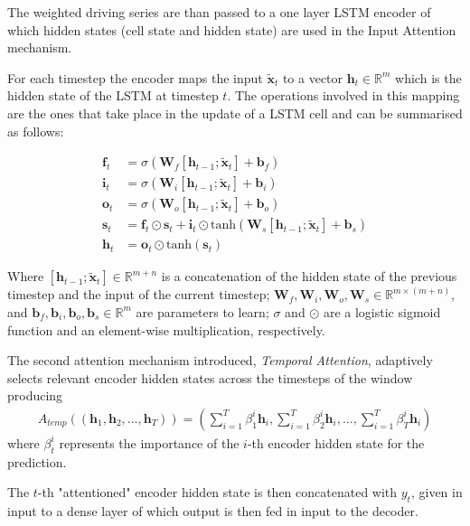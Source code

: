 \documentclass{article}
\begin{document}
The weighted driving series are than passed to a one layer LSTM encoder of
which hidden states (cell state and hidden state) are used in the Input Attention
mechanism.

For each timestep the encoder maps the input $\tilde{\mathbf{x}}_t$ to a vector
$\mathbf{h}_t \in \mathbb{R}^m$ which is the hidden state of
the LSTM at timestep $t$. The operations involved in this mapping are the ones
that take place in the update of a LSTM cell and can be summarised as follows:


\begin{equation} \label{eq:lstm}
\begin{split}
\mathbf{f}_t &= \sigma (\mathbf{W}_f[\mathbf{h}_{t-1};\tilde{\mathbf{x}}_t] +
\mathbf{b}_f) \\
\mathbf{i}_t &= \sigma (\mathbf{W}_i[\mathbf{h}_{t-1};\tilde{\mathbf{x}}_t] +
\mathbf{b}_i) \\
\mathbf{o}_t &= \sigma (\mathbf{W}_o[\mathbf{h}_{t-1};\tilde{\mathbf{x}}_t] +
\mathbf{b}_o) \\
\mathbf{s}_t &= \mathbf{f}_t \odot \mathbf{s}_t + \mathbf{i}_t 
				\odot
\text{tanh}(\mathbf{W}_s[\mathbf{h}_{t-1};\tilde{\mathbf{x}}_t] + \mathbf{b}_s) \\
\mathbf{h}_t &= \mathbf{o}_t \odot \text{tanh}(\mathbf{s}_t)
\end{split}
\end{equation}

Where $[\mathbf{h}_{t-1};\tilde{\mathbf{x}}_t] \in \mathbb{R}^{m + n}$ is a
concatenation of the hidden state of the previous
timestep and the input of the current timestep;
$\mathbf{W}_f,\mathbf{W}_i,\mathbf{W}_o,\mathbf{W}_s
\in \mathbb{R}^{m \times(m+n)}$, and $\mathbf{b}_f, \mathbf{b}_i,
\mathbf{b}_o,\mathbf{b}_s \in \mathbb{R}^m$ are
parameters to learn; $\sigma$ and $\odot$ are a logistic sigmoid function and
an element-wise multiplication,
respectively.

The second attention mechanism introduced, \textit{Temporal Attention}, adaptively
selects relevant encoder hidden states across the timesteps of the window
producing
\begin{align*}
A_{temp}((\mathbf{h}_1, \mathbf{h}_2, ..., \mathbf{h}_T)) =
\left(\sum_{i=1}^T \beta_1^i \mathbf{h}_i, \sum_{i=1}^T \beta_2^i\mathbf{h}_i, ..., \sum_{i=1}^T \beta_T^i\mathbf{h}_i \right)
\end{align*}
where $\beta^i_t$ represents the importance of the $i$-th encoder
hidden state for the prediction.

The $t$-th "attentioned" encoder hidden state is then concatenated with
$y_t$, given in input to a dense layer of which output is then fed in input
to the decoder.
\end{document}
